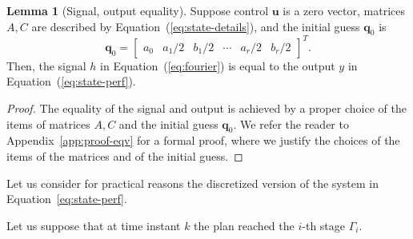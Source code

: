 \documentclass[letterpaper,10pt,conference]{ieeeconf}
\theoremstyle{definition}
\newtheorem{lem}[thm]{Lemma}
\begin{document}
\begin{lem}[Signal, output equality]\label{lem:eqv}Suppose control $\mathbf{u}$ is a zero vector, matrices $A,C$ are described by Equation~(\ref{eq:state-details}), and the initial guess $\mathbf{q}_0$ is 
  \begin{equation*}
  \mathbf{q}_0=\begin{bmatrix}a_0 & a_1/2 & b_1/2 & \cdots & a_r/2 & b_r/2\end{bmatrix}^T.
  \end{equation*} 
  Then, the signal $h$ in Equation~(\ref{eq:fourier}) is equal to the output $y$ in Equation~(\ref{eq:state-perf}).
\end{lem}
\begin{proof}
The equality of the signal and output is achieved by a proper choice of the items of matrices $A,C$ and the initial guess $\mathbf{q}_0$. We refer the reader to Appendix~\ref{app:proof-eqv} for a formal proof, where we justify the choices of the items of the matrices and of the initial guess. 
\end{proof}

Let us consider for practical reasons the discretized version of the system in Equation~\ref{eq:state-perf}. 

Let us suppose that at time instant $k$ the plan reached the $i$-th stage $\Gamma_i$.
\end{document}
